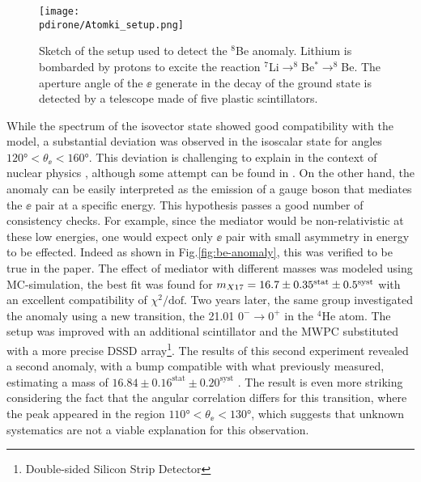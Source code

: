 \begin{figure}[htb!]
  \centering
  \texttt{[image: \\pdirone/Atomki\_setup.png]}
  \caption[Sketch of the setup used to detect the $^8$Be anomaly.]{Sketch of the setup used to detect the $^8$Be anomaly. Lithium is bombarded by protons to excite the reaction $^7$Li$\to ^8$Be$^* \to ^8$Be. The aperture angle of the $\ee$ generate in the decay of the ground state is detected by a telescope made of five plastic scintillators. \cite{PhysRevD.95.035017}}
  \label{fig:x17-setup}
\end{figure}

While the spectrum of the isovector state showed good compatibility with the model, a substantial deviation was observed in the isoscalar state for angles $120 \si{\degree} < \theta_{\ee} < 160 \si{\degree}$. This deviation is challenging to explain in the context of nuclear physics \cite{Krasznahorkay:2015iga}, although some attempt can be found in \cite{Zhang:2017zap,Koch:2020ouk}. On the other hand, the anomaly can be easily interpreted as the emission of a gauge boson that mediates the $\ee$ pair at a specific energy. This hypothesis passes a good number of consistency checks. For example, since the mediator would be non-relativistic at these low energies, one would expect only $\ee$ pair with small asymmetry in energy to be effected. Indeed as shown in Fig.\ref{fig:be-anomaly}, this was verified to be true in the paper. The effect of mediator with different masses was modeled using MC-simulation, the best fit was found for $m_{X17} = 16.7 \pm 0.35^{\textrm{stat}} \pm 0.5^{\textrm{syst}}$ with an excellent compatibility of $\chi^2/\textrm{dof}$. Two years later, the same group investigated the anomaly using a new transition, the 21.01 \mev $0^- \to 0^+$ in the $^4$He atom. The setup was improved with an additional scintillator and the MWPC substituted with a more precise  DSSD array\footnote{Double-sided Silicon Strip Detector}. The results of this second experiment revealed a second anomaly, with a bump compatible with what previously measured, estimating a mass of $16.84 \pm 0.16^{\textrm{stat}} \pm 0.20^{\textrm{syst}}$ \cite{Krasznahorkay:2019lyl}. The result is even more striking considering the fact that the angular correlation differs for this transition, where the peak appeared in the region $110 \si{\degree} < \theta_{\ee} < 130 \si{\degree}$, which suggests that unknown systematics are not a viable explanation for this observation.

